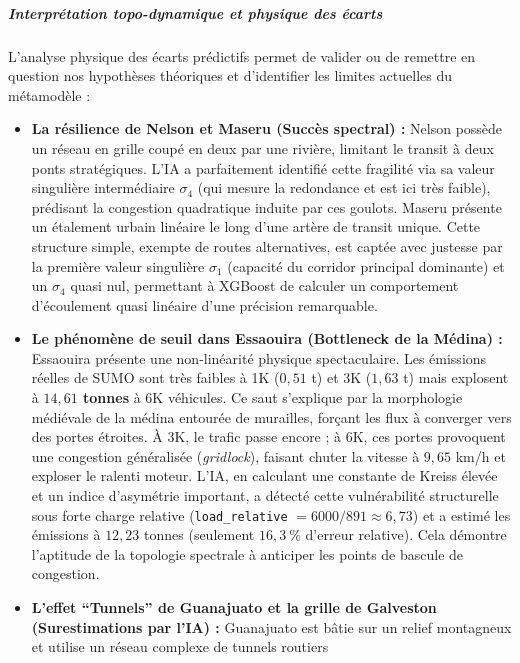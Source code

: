 \documentclass[10pt, a4paper]{article}
\begin{document}
\subparagraph{Interprétation topo-dynamique et physique des
écarts}\label{interpruxe9tation-topo-dynamique-et-physique-des-uxe9carts}

L'analyse physique des écarts prédictifs permet de valider ou de
remettre en question nos hypothèses théoriques et d'identifier les
limites actuelles du métamodèle :

\begin{itemize}
\item
  \textbf{La résilience de Nelson et Maseru (Succès spectral) :} Nelson
  possède un réseau en grille coupé en deux par une rivière, limitant le
  transit à deux ponts stratégiques. L'IA a parfaitement identifié cette
  fragilité via sa valeur singulière intermédiaire \(\sigma_4\) (qui
  mesure la redondance et est ici très faible), prédisant la congestion
  quadratique induite par ces goulots. Maseru présente un étalement
  urbain linéaire le long d'une artère de transit unique. Cette
  structure simple, exempte de routes alternatives, est captée avec
  justesse par la première valeur singulière \(\sigma_1\) (capacité du
  corridor principal dominante) et un \(\sigma_4\) quasi nul, permettant
  à XGBoost de calculer un comportement d'écoulement quasi linéaire
  d'une précision remarquable.
\item
  \textbf{Le phénomène de seuil dans Essaouira (Bottleneck de la Médina)
  :} Essaouira présente une non-linéarité physique spectaculaire. Les
  émissions réelles de SUMO sont très faibles à 1K (\(0,51\) t) et 3K
  (\(1,63\) t) mais explosent à \textbf{\(14,61\) tonnes} à 6K
  véhicules. Ce saut s'explique par la morphologie médiévale de la
  médina entourée de murailles, forçant les flux à converger vers des
  portes étroites. À 3K, le trafic passe encore ; à 6K, ces portes
  provoquent une congestion généralisée (\emph{gridlock}), faisant
  chuter la vitesse à \(9,65\) km/h et exploser le ralenti moteur. L'IA,
  en calculant une constante de Kreiss élevée et un indice d'asymétrie
  important, a détecté cette vulnérabilité structurelle sous forte
  charge relative (\texttt{load\_relative}
  \(= 6000 / 891 \approx 6,73\)) et a estimé les émissions à \(12,23\)
  tonnes (seulement \(16,3\ \%\) d'erreur relative). Cela démontre
  l'aptitude de la topologie spectrale à anticiper les points de bascule
  de congestion.
\item
  \textbf{L'effet ``Tunnels'' de Guanajuato et la grille de Galveston
  (Surestimations par l'IA) :} Guanajuato est bâtie sur un relief
  montagneux et utilise un réseau complexe de tunnels routiers

\end{itemize}
\end{document}
